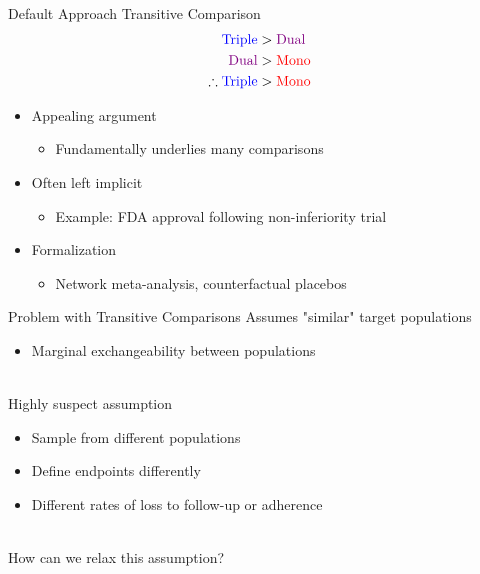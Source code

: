 \documentclass{beamer}
\newcommand{\blue}[1]{\textcolor{blue}{#1}}
\newcommand{\red}[1]{\textcolor{red}{#1}}
\newcommand{\violet}[1]{\textcolor{violet}{#1}}
\begin{document}
\begin{frame}{Default Approach}
	Transitive Comparison
	\begin{equation}
		\nonumber
		\begin{split}
			\text{\blue{Triple}} & > \text{\violet{Dual}} \\
			\text{\violet{Dual}} & > \text{\red{Mono}} \\
			\therefore \text{\blue{Triple}} & > \text{\red{Mono}}
		\end{split}
	\end{equation}
	\begin{itemize}
		\item Appealing argument
		\begin{itemize}
			\item Fundamentally underlies many comparisons
		\end{itemize}
		\item Often left implicit
		\begin{itemize}
			\item Example: FDA approval following non-inferiority trial
		\end{itemize}
		\item Formalization
		\begin{itemize}
			\item Network meta-analysis, counterfactual placebos
		\end{itemize}
	\end{itemize}	
\end{frame}

\begin{frame}{Problem with Transitive Comparisons}
	Assumes "similar" target populations
	\begin{itemize}
		\item Marginal exchangeability between populations
	\end{itemize}~\\
	Highly suspect assumption
	\begin{itemize}
		\item Sample from different populations
		\item Define endpoints differently 
		\item Different rates of loss to follow-up or adherence
	\end{itemize}~\\
	How can we relax this assumption?
\end{frame}
\end{document}
